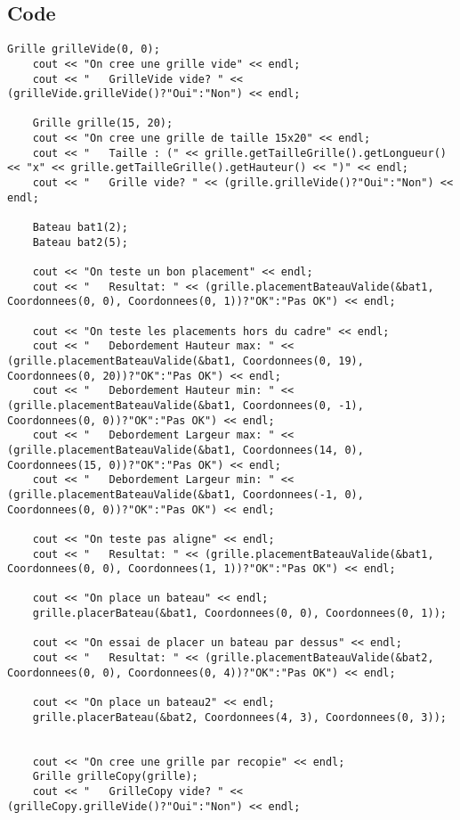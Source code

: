         \subsection{Code}
\begin{lstlisting}
Grille grilleVide(0, 0);
    cout << "On cree une grille vide" << endl;
    cout << "   GrilleVide vide? " << (grilleVide.grilleVide()?"Oui":"Non") << endl;

    Grille grille(15, 20);
    cout << "On cree une grille de taille 15x20" << endl;
    cout << "   Taille : (" << grille.getTailleGrille().getLongueur()  << "x" << grille.getTailleGrille().getHauteur() << ")" << endl;
    cout << "   Grille vide? " << (grille.grilleVide()?"Oui":"Non") << endl;

    Bateau bat1(2);
    Bateau bat2(5);

    cout << "On teste un bon placement" << endl;
    cout << "   Resultat: " << (grille.placementBateauValide(&bat1, Coordonnees(0, 0), Coordonnees(0, 1))?"OK":"Pas OK") << endl;

    cout << "On teste les placements hors du cadre" << endl;
    cout << "   Debordement Hauteur max: " << (grille.placementBateauValide(&bat1, Coordonnees(0, 19), Coordonnees(0, 20))?"OK":"Pas OK") << endl;
    cout << "   Debordement Hauteur min: " << (grille.placementBateauValide(&bat1, Coordonnees(0, -1), Coordonnees(0, 0))?"OK":"Pas OK") << endl;
    cout << "   Debordement Largeur max: " << (grille.placementBateauValide(&bat1, Coordonnees(14, 0), Coordonnees(15, 0))?"OK":"Pas OK") << endl;
    cout << "   Debordement Largeur min: " << (grille.placementBateauValide(&bat1, Coordonnees(-1, 0), Coordonnees(0, 0))?"OK":"Pas OK") << endl;

    cout << "On teste pas aligne" << endl;
    cout << "   Resultat: " << (grille.placementBateauValide(&bat1, Coordonnees(0, 0), Coordonnees(1, 1))?"OK":"Pas OK") << endl;

    cout << "On place un bateau" << endl;
    grille.placerBateau(&bat1, Coordonnees(0, 0), Coordonnees(0, 1));

    cout << "On essai de placer un bateau par dessus" << endl;
    cout << "   Resultat: " << (grille.placementBateauValide(&bat2, Coordonnees(0, 0), Coordonnees(0, 4))?"OK":"Pas OK") << endl;

    cout << "On place un bateau2" << endl;
    grille.placerBateau(&bat2, Coordonnees(4, 3), Coordonnees(0, 3));


    cout << "On cree une grille par recopie" << endl;
    Grille grilleCopy(grille);
    cout << "   GrilleCopy vide? " << (grilleCopy.grilleVide()?"Oui":"Non") << endl;


\end{lstlisting}
